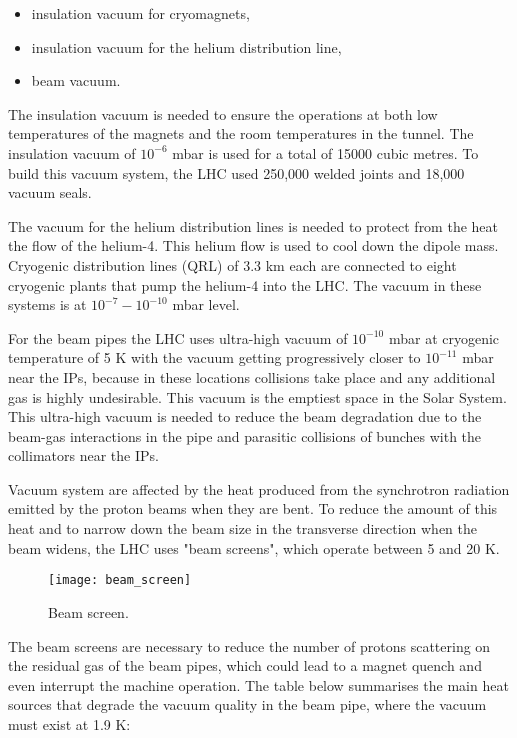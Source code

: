 \begin{normalsize}
\begin{itemize}
\item insulation vacuum for cryomagnets,
\item insulation vacuum for the helium distribution line,
\item beam vacuum.
\end{itemize}


The insulation vacuum is needed to ensure the operations at both low temperatures of the magnets and the room temperatures in the tunnel. The insulation vacuum of $10^{-6}$ mbar is used for a total of 15000 cubic metres. To build this vacuum system, the LHC used 250,000 welded joints and 18,000 vacuum seals. 


The vacuum for the helium distribution lines is needed to protect from the heat the flow of the helium-4. This helium flow is used to cool down the dipole mass. Cryogenic distribution lines (QRL) of 3.3 km each are connected to eight cryogenic plants that pump the helium-4 into the LHC. The vacuum in these systems is at $10^{-7}-10^{-10}$ mbar level. 



For the beam pipes the LHC uses ultra-high vacuum of $10^{-10}$ mbar at cryogenic temperature of 5 K with the vacuum getting progressively closer to $10^{-11}$ mbar near the IPs, because in these locations collisions take place and any additional gas is highly undesirable. This vacuum is the emptiest space in the Solar System. This ultra-high vacuum is needed to reduce the beam degradation due to the beam-gas interactions in the pipe and parasitic collisions of bunches with the collimators near the IPs. 

Vacuum system are affected by the heat produced from the synchrotron radiation emitted by the proton beams when they are bent. To reduce the amount of this heat and to narrow down the beam size in the transverse direction when the beam widens, the LHC uses "beam screens", which operate between 5 and 20 K. 


\begin{figure}[H]
  \centering
  \texttt{[image: beam\_screen]}
  \caption{Beam screen.}\label{beam_screen}
\end{figure}



The beam screens are necessary to reduce the number of protons scattering on the residual gas of the beam pipes, which could lead to a magnet quench and even interrupt the machine operation. The table below summarises the main heat sources that degrade the vacuum quality in the beam pipe, where the vacuum must exist at 1.9 K:



\end{normalsize}
